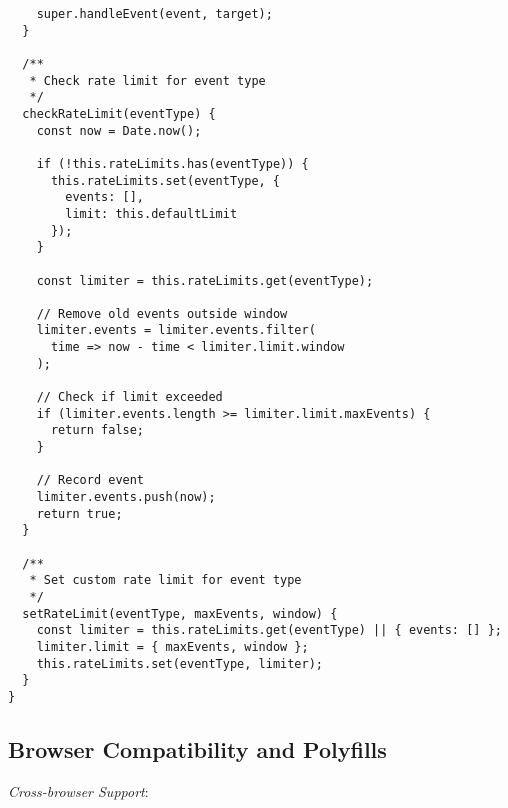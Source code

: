 \documentclass[11pt]{article}
\begin{document}
\begin{verbatim}
    super.handleEvent(event, target);
  }
  
  /**
   * Check rate limit for event type
   */
  checkRateLimit(eventType) {
    const now = Date.now();
    
    if (!this.rateLimits.has(eventType)) {
      this.rateLimits.set(eventType, {
        events: [],
        limit: this.defaultLimit
      });
    }
    
    const limiter = this.rateLimits.get(eventType);
    
    // Remove old events outside window
    limiter.events = limiter.events.filter(
      time => now - time < limiter.limit.window
    );
    
    // Check if limit exceeded
    if (limiter.events.length >= limiter.limit.maxEvents) {
      return false;
    }
    
    // Record event
    limiter.events.push(now);
    return true;
  }
  
  /**
   * Set custom rate limit for event type
   */
  setRateLimit(eventType, maxEvents, window) {
    const limiter = this.rateLimits.get(eventType) || { events: [] };
    limiter.limit = { maxEvents, window };
    this.rateLimits.set(eventType, limiter);
  }
}
\end{verbatim}
\subsection{Browser Compatibility and Polyfills}
\label{sec:org9c833e4}

\emph{Cross-browser Support}:
\end{document}
